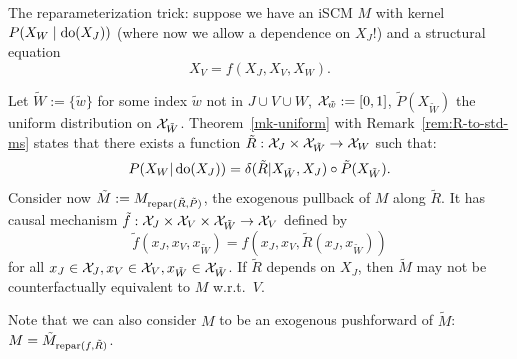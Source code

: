 {\begin{Eg}
\end{Eg}
}

\begin{Eg}\label{eg:reparameterization_trick}
The reparameterization trick:
suppose we have an iSCM $M$ with kernel $P(X_W \mid \operatorname{do}(X_J))$ (where now we allow a dependence on $X_J$!) and a structural equation
$$X_V = f(X_J,X_V,X_W).$$

Let $\tilde{W} := \{\tilde{w}\}$ for some index $\tilde{w}$ not in $J \cup V \cup W$, $\mathcal{X}_{\tilde{w}} := [0,1]$, $\tilde{P}(X_{\tilde{W}})$ the uniform distribution on $\mathcal{X}_{\tilde{W}}$.
Theorem~\ref{mk-uniform} with Remark~\ref{rem:R-to-std-ms} states that there exists a function $\tilde R : \mathcal{X}_J \times \mathcal{X}_{\tilde{W}} \to \mathcal{X}_W$ such that:
  \[ P(X_W|\operatorname{do}(X_J)) = \delta(\tilde R|X_{\tilde{W}},X_J) \circ \tilde{P}(X_{\tilde{W}}).\]
Consider now $\tilde{M} := M_{\mathrm{repar}({\tilde{R}},{\tilde{P}})}$, the exogenous pullback of $M$ along $\tilde{R}$.
It has causal mechanism $\tilde{f} : \mathcal{X}_{J} \times \mathcal{X}_{V} \times \mathcal{X}_{\tilde{W}} \to \mathcal{X}_{V}$ defined by
  $$\tilde{f}(x_J,x_V,x_{\tilde{W}}) = f(x_J,x_V,\tilde{R}(x_J,x_{\tilde{W}}))$$
for all $x_J \in \mathcal{X}_J, x_V \in \mathcal{X}_V, x_{\tilde{W}} \in \mathcal{X}_{\tilde{W}}$.
If $\tilde{R}$ depends on $X_J$, then $\tilde{M}$ may not be counterfactually equivalent to $M$ w.r.t.\ $V$.

Note that we can also consider $M$ to be an exogenous pushforward of $\tilde{M}$: $M = \tilde{M}_{\mathrm{repar}({f},{\tilde{R}})}$.
\end{Eg}

